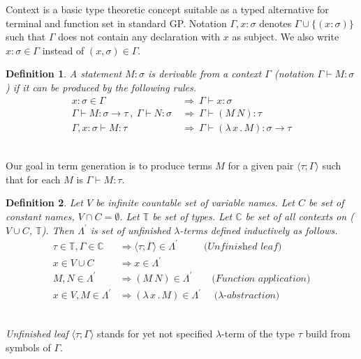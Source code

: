 \documentclass[conference]{IEEEtran}
\newtheorem{definition}{Definition}
\newcommand{\lterm}{$\lambda$-term\xspace}
\newcommand{\lterms}{$\lambda$-terms\xspace}
\newcommand{\tur}[3]{#1\vdash{}#2 \colon #3}
\newcommand{\then}{\Rightarrow\xspace}
\newcommand{\lamb}[2]{( \lambda \, #1 \, . \, #2 )}
\newcommand{\ar}{\rightarrow\xspace}
\newcommand{\T}{\mathbb{T}\xspace}
\newcommand{\C}{\mathbb{C}\xspace}
\newcommand{\Lpr}{\Lambda^\prime}
\newcommand{\ul}[2]{\langle #1 ; #2 \rangle}
\begin{document}
Context is a basic type theoretic concept suitable as a typed alternative
for terminal and function set in standard GP. 
Notation $\Gamma,x:\sigma $ denotes $ \Gamma\cup\{(x:\sigma)\}$ 
such that $\Gamma$ does not contain any declaration with $x$ as subject.
We also write $x:\sigma \in \Gamma$ instead of $(x,\sigma) \in \Gamma$.\\

\begin{definition}
A statement $M\colon\sigma$ is \textit{derivable from}
a context $\Gamma$ (notation 
\mbox{$\Gamma\vdash{}M\colon\sigma$}) 
if it can be produced by the following rules.
\begin{align*}
x : \sigma \in \Gamma &~\then~ \tur{\Gamma}{x}{\sigma}\\
\tur{\Gamma}{M}{\sigma \ar \tau}~,~\tur{\Gamma}{N}{\sigma} 
&~\then~ \tur{\Gamma}{(M~N)}{\tau}\\  
\tur{\Gamma,x:\sigma}{M}{\tau}
&~\then~ \tur{\Gamma}{\lamb{x}{M}}{\sigma \ar \tau} 
\end{align*}
\end{definition}
~\\

Our goal in term generation is to produce terms $M$
for a given pair $\ul{\tau}{\Gamma}$
such that for each $M$ is $\tur{\Gamma}{M}{\tau}$.\\

\begin{definition}
Let $V$ be infinite countable set of {\it 
variable names}. Let $C$ be set of {\it constant names}, 
$V \cap C = \emptyset$.	
Let $\T$ be set of types.
Let $\C$ be set of all contexts on ($V \cup C$, $\T$).
Then $\Lpr$ is set of 
\textit{unfinished  \lterms} defined inductively as follows.	
\begin{align*}
\tau \in \T , \Gamma \in \C &\then \ul{\tau}{\Gamma} \in \Lpr
\textit{~~~~~~~~(Unfinished leaf)}\\
x   \in V \cup C  &\then x     \in \Lpr \\
M,N \in \Lpr   &\then (M~N) \in \Lpr 
\textit{~~~~~~(Function application)} \\
x   \in V , M \in \Lpr &\then \lamb{x}{M} \in \Lpr
\textit{~~~~($\lambda$-abstraction)} 
\end{align*}
\end{definition}
~\\

\textit{Unfinished leaf} $\ul{\tau}{\Gamma}$ 
stands for yet not specified \lterm of the type $\tau$ 
build from symbols of $\Gamma$.
\end{document}

